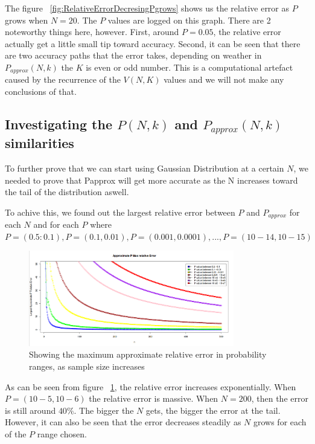 \documentclass[12pt]{article}
\begin{document}
The figure ~\ref{fig:RelativeErrorDecresingPgrows} shows us the relative error as $P$ grows when $N = 20$. The $P$ values are logged on this graph. There are 2 noteworthy things here, however. First, around $P = 0.05$, the relative error actually get a little small tip toward accuracy. Second, it can be seen that there are two accuracy paths that the error takes, depending on weather in $P_{approx}(N, k)$  the $K$ is even or odd number. This is a computational artefact caused by the recurrence of the $V(N, K)$ values and we will not make any conclusions of that.

\subsection{Investigating the $P(N, k)$ and $P_{approx}(N, k)$ similarities}
To further prove that we can start using Gaussian Distribution at a certain $N$, we needed to prove that Papprox will get more accurate as the N increases toward the tail of the distribution aswell.

To achive this, we found out the largest relative error between $P$ and $P_{approx}$ for each $N$ and for each $P$ where $P = (0.5:0.1), P = (0.1, 0.01), P = (0.001, 0.0001), ... , P = (10-14 , 10-15)$

\begin{figure}
	\centering
  \includegraphics[width=0.8\textwidth]{LargestApproxPRelativeError3}
	\caption{Showing the maximum approximate relative error in probability ranges, as sample size increases}
	\label{fig:LargestApproxPRelativeError}
\end{figure}

As can be seen from figure ~\ref{fig:LargestApproxPRelativeError}, the relative error increases exponentially. When $P = (10-5 , 10-6)$ the relative error is massive. When $N=200$, then the error is still around $40\%$. The bigger the $N$ gets, the bigger the error at the tail. However, it can also be seen that the error decreases steadily as $N$ grows for each of the $P$ range chosen.
\end{document}
